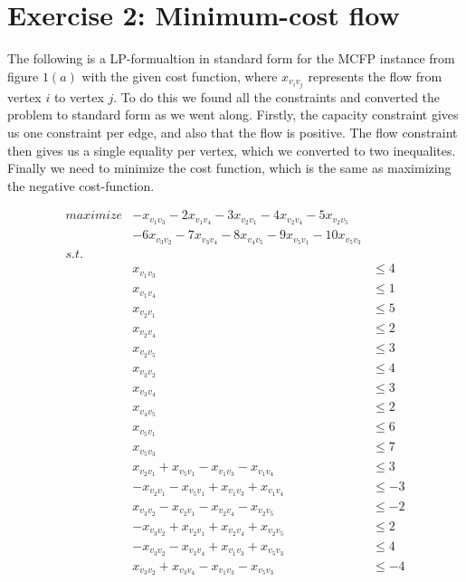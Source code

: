 \documentclass[11pt,a4paper]{article}
\begin{document}
\section{Exercise 2: Minimum-cost flow}
The following is a LP-formualtion in standard form for the MCFP instance from figure
$1(a)$ with the given cost function, where $x_{v_iv_j}$ represents the flow from vertex
$i$ to vertex $j$. To do this we found all the constraints and converted the problem to
standard form as we went along. Firstly, the capacity constraint gives us one constraint
per edge, and also that the flow is positive. The flow constraint then gives us a single
equality per vertex, which we converted to two inequalites. Finally we need to minimize
the cost function, which is the same as maximizing the negative cost-function.

\begin{align*}
    maximize & - x_{v_1v_3} - 2x_{v_1v_4} - 3x_{v_2v_1} - 4x_{v_2v_4} - 5x_{v_2v_5} \\
             & -6x_{v_3v_2} - 7x_{v_3v_4} - 8x_{v_4v_5} - 9x_{v_5v_1} - 10x_{v_5v_3} \\
    s.t.     & \\
             &  x_{v_1v_3} &\leq 4 \\
             &  x_{v_1v_4} &\leq 1 \\
             &  x_{v_2v_1} &\leq 5 \\
             &  x_{v_2v_4} &\leq 2 \\
             &  x_{v_2v_5} &\leq 3 \\
             &  x_{v_3v_2} &\leq 4 \\
             &  x_{v_3v_4} &\leq 3 \\
             &  x_{v_4v_5} &\leq 2 \\
             &  x_{v_5v_1} &\leq 6 \\
             &  x_{v_5v_3} &\leq 7 \\
             &  x_{v_2v_1} + x_{v_5v_1} - x_{v_1v_3} - x_{v_1v_4}  &\leq 3 \\
             &  -x_{v_2v_1} - x_{v_5v_1} + x_{v_1v_3} + x_{v_1v_4} &\leq -3  \\
             &  x_{v_3v_2} - x_{v_2v_1} - x_{v_2v_4} - x_{v_2v_5}  &\leq -2 \\ 
             &  -x_{v_3v_2} + x_{v_2v_1} + x_{v_2v_4} + x_{v_2v_5} &\leq 2 \\ 
             &  -x_{v_3v_2} - x_{v_3v_4} + x_{v_1v_3} + x_{v_5v_3} &\leq 4 \\
             &  x_{v_3v_2} + x_{v_3v_4} - x_{v_1v_3} - x_{v_5v_3}  &\leq -4 \\

\end{align*}
\end{document}

